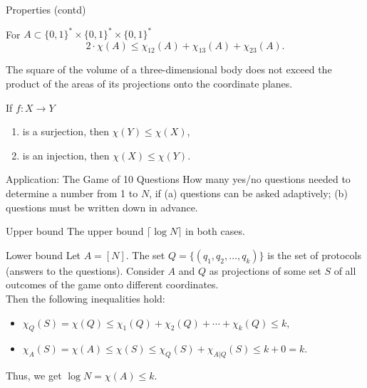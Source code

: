 \documentclass[aspectratio=169]{beamer}
\newcommand{\bits}{\{0,1\}}
\newcommand{\bitstr}{\bits^*}
\newcommand{\seqn}[2]{{#1}_1,{#1}_2,\dotsc,{#1}_{#2}}
\begin{document}
\begin{frame}{Properties (contd)}
\begin{theorem}\label{thm:volume}
    For \(A\subset\bitstr\times\bitstr\times\bitstr\)
    \[2\cdot\chi(A) \le \chi_{12}(A) + \chi_{13}(A) + \chi_{23}(A).\]
\end{theorem}
\begin{corollary}
    The square of the volume of a three-dimensional body does not exceed the product of the areas of its projections onto the coordinate planes.
\end{corollary}

\begin{theorem}
    If \(f: X\to Y\)
    \begin{enumerate}
        \item is a surjection, then \(\chi(Y)\le \chi(X)\),
        \item is an injection, then \(\chi(X)\le \chi(Y)\).
    \end{enumerate}
\end{theorem}
\end{frame}

\begin{frame}{Application: The Game of 10 Questions}
    How many yes/no questions needed to determine a number from 1 to \(N\), if (a) questions can be asked adaptively; (b) questions must be written down in advance.

    \pause
    \begin{block}{Upper bound}
    The upper bound \(\lceil\log N\rceil\) in both cases.
    \end{block}
    \pause

    \begin{block}{Lower bound}
    Let \(A=[N]\). The set \(Q = \{(\seqn{q}{k})\}\) is the set of protocols (answers to the questions). Consider \(A\) and \(Q\) as projections of some set \(S\) of all outcomes of the game onto different coordinates. \\
    Then the following inequalities hold:
    \begin{itemize}
        \item \( \chi_Q(S) = \chi(Q) \le \chi_1(Q) + \chi_2(Q) + \dotsb + \chi_k(Q) \le k, \)
        \item \( \chi_A(S) = \chi(A) \le \chi(S) \le \chi_Q(S) + \chi_{A|Q}(S) \le k + 0 = k. \)
    \end{itemize}
    Thus, we get \(\log N = \chi(A) \le k\).
    \end{block}
\end{frame}
\end{document}
